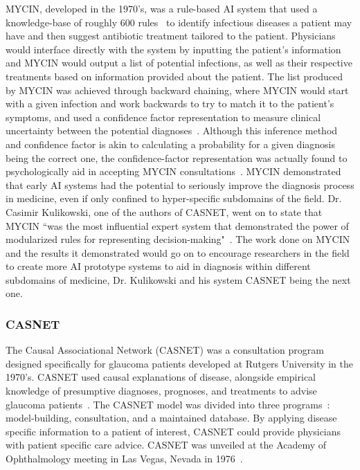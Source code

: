 \documentclass[a4paper]{article}
\begin{document}
MYCIN, developed in the 1970's, was a rule-based AI system that used a knowledge-base of roughly 600 rules~\cite{kaul_history_2020} to identify infectious diseases a patient may have and then suggest antibiotic treatment tailored to the patient. Physicians would interface directly with the system by inputting the patient's information and MYCIN would output a list of potential infections, as well as their respective treatments based on information provided about the patient. The list produced by MYCIN was achieved through backward chaining, where MYCIN would start with a given infection and work backwards to try to match it to the patient's symptoms, and used a confidence factor representation to measure clinical uncertainty between the potential diagnoses~\cite{kulikowski_beginnings_2019}. Although this inference method and confidence factor is akin to calculating a probability for a given diagnosis being the correct one, the confidence-factor representation was actually found to psychologically aid in accepting MYCIN consultations~\cite{kulikowski_beginnings_2019}. MYCIN demonstrated that early AI systems had the potential to seriously improve the diagnosis process in medicine, even if only confined to hyper-specific subdomains of the field. Dr. Casimir Kulikowski, one of the authors of CASNET, went on to state that MYCIN ``was the most influential expert system that demonstrated the power of modularized rules for representing decision-making"~\cite{kulikowski_beginnings_2019}. The work done on MYCIN and the results it demonstrated would go on to encourage researchers in the field to create more AI prototype systems to aid in diagnosis within different subdomains of medicine, Dr. Kulikowski and his system CASNET being the next one.

\subsubsection{CASNET}

The Causal Associational Network (CASNET) was a consultation program designed specifically for glaucoma patients developed at Rutgers University in the 1970's. CASNET used causal explanations of disease, alongside empirical knowledge of presumptive diagnoses, prognoses, and treatments to advise glaucoma patients~\cite{kulikowski_beginnings_2019}. The CASNET model was divided into three programs~\cite{kaul_history_2020}: model-building, consultation, and a maintained database. By applying disease specific information to a patient of interest, CASNET could provide physicians with patient specific care advice. CASNET was unveiled at the Academy of Ophthalmology meeting in Las Vegas, Nevada in 1976~\cite{kaul_history_2020}.
\end{document}
